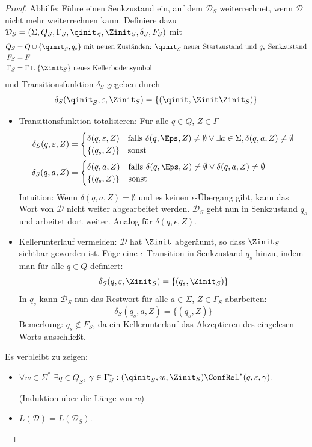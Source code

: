 \begin{proof}
  Abhilfe: Führe einen Senkzustand ein, auf dem $\mathcal{D}_S$ weiterrechnet, wenn $\mathcal{D}$ nicht mehr weiterrechnen kann. 
  Definiere dazu $\mathcal{D}_S = (\Sigma, Q_S, \Gamma_S, \qinit_S, \Zinit_S, \delta_S, F_S)$ mit
  \begin{align*}
  Q_S &= Q \cup \{\qinit_S, q_s\} \text{ mit neuen Zuständen: $\qinit_S$ neuer Startzustand und $q_s$ Senkzustand} \\
  F_S &= F \\
  \Gamma_S &= \Gamma \cup \{\Zinit_S\} \text{ neues Kellerbodensymbol}
  \end{align*}
  und Transitionsfunktion $\delta_S$ gegeben durch
  \[\delta_S (\qinit_S, \varepsilon, \Zinit_S) = \{ (\qinit, \Zinit\Zinit_S) \} \]
  \begin{itemize}
  \item Transitionsfunktion totalisieren: Für alle $q\in Q$, $Z \in \Gamma$
    \begin{align*}
      \delta_S (q, \varepsilon, Z) &=
      \begin{cases}
        \delta (q, \varepsilon, Z) & \text{falls
        }\delta (q, \Eps, Z)\ne\emptyset\vee\exists a\in\Sigma, \delta (q, a, Z)\ne \emptyset \\
        \{ (q_s, Z) \} & \text{sonst}
      \end{cases} \\
      \delta_S (q, a, Z) &=
      \begin{cases}
        \delta (q, a, Z) & \text{falls }\delta (q, \Eps, Z)\ne\emptyset\vee\delta (q,
        a, Z) \ne \emptyset \\
        \{ (q_s, Z) \} & \text{sonst}
      \end{cases}
    \end{align*}
    Intuition: Wenn $\delta(q, a, Z) = \emptyset$ und es keinen $\epsilon$-Übergang gibt, kann das Wort von $\mathcal{D}$ nicht weiter abgearbeitet werden. $\mathcal{D}_S$ geht nun in Senkzustand $q_s$ und arbeitet dort weiter. Analog für $\delta(q, \epsilon, Z)$.
  \item Kellerunterlauf vermeiden: $\mathcal{D}$ hat $\Zinit$ abgeräumt, so dass $\Zinit_S$
    sichtbar geworden ist. Füge eine $\epsilon$-Transition in
     Senkzustand $q_s$ hinzu, indem man für alle $q\in Q$ definiert:
    \[\delta_S (q, \varepsilon, \Zinit_S) = \{ (q_s, \Zinit_S) \} \]
  In $q_s$ kann $\mathcal{D}_S$ nun das Restwort für alle $a\in\Sigma$, $Z\in \Gamma_S$ abarbeiten:
    \[\delta_S (q_s, a, Z) = \{ (q_s, Z) \}\]
    Bemerkung: $q_s \not \in F_S$, da ein Kellerunterlauf
    das Akzeptieren des eingelesen Worts ausschließt.
  \end{itemize}

  Es verbleibt zu zeigen:
  \begin{itemize}
   \item $\forall w\in \Sigma^*$ $\exists q\in Q_S$,
  $\gamma\in\Gamma_S^*: (\qinit_S, w, \Zinit_S) \ConfRel^* (q,
  \varepsilon, \gamma)$.
  
  (Induktion über die Länge von $w$)
  \item $L (\mathcal{D}) = L (\mathcal{D}_S)$.
  \qedhere
  \end{itemize}
\end{proof}

